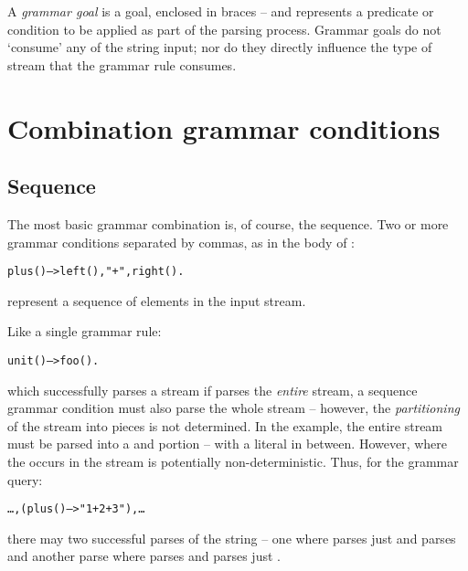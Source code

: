 A \emph{grammar goal} is a goal, enclosed in braces --  and represents a predicate or condition to be applied as part of the parsing process. Grammar goals do not `consume' any of the string input; nor do they directly influence the type of stream that the grammar rule consumes.

\section{Combination grammar conditions}
\subsection{Sequence}
\label{grammar:sequence}
The most basic grammar combination is, of course, the sequence. Two or more grammar conditions separated by commas, as in the body of :
\begin{alltt}
plus() --> left(), "+", right().
\end{alltt}
represent a sequence of elements in the input stream.

Like a single grammar rule:
\begin{alltt}
unit() --> foo().
\end{alltt}
which successfully parses a stream if  parses the \emph{entire} stream, a sequence grammar condition must also parse the whole stream -- however, the \emph{partitioning} of the stream into pieces is not determined. In the  example, the entire stream must be parsed into a  and  portion -- with a literal \q{+} in between. However, where the \q{+} occurs in the stream is potentially non-deterministic. Thus, for the grammar query:
\begin{alltt}
\ldots,(plus() --> "1+2+3"),\ldots
\end{alltt}
there may two successful parses of the string  -- one where  parses just  and  parses  and another parse where  parses  and  parses just .


